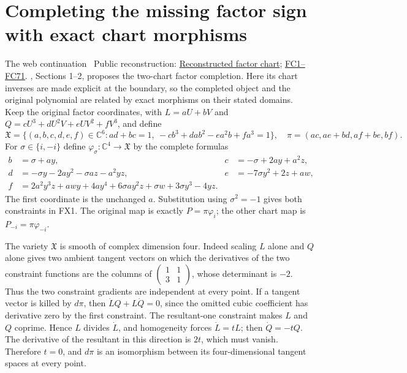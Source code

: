 \documentclass[11pt]{article}
\newcommand{\C}{\mathbb C}
\begin{document}
\section{Completing the missing factor sign with exact chart morphisms}
The web continuation \cite{WebFable}%
~Public reconstruction: \href{https://github.com/KokunoYumeto/zeta-function-research-reader/blob/689a8f87e9c12b7a99b01b3123438c6751ee608f/workbenches/splitzero-tandem/continuations/20260920-fable-boundary-action/source_intake/PROOF.md\#L1}{Reconstructed factor chart}; \href{https://github.com/KokunoYumeto/zeta-function-research-reader/blob/689a8f87e9c12b7a99b01b3123438c6751ee608f/workbenches/splitzero-tandem/continuations/20260920-fable-conductor/FABLE_TO_ORIGINAL_CONDUCTOR.tex\#L52}{FC1--FC71}.%
{}, Sections 1--2, proposes the
two-chart factor completion. Here its chart inverses are made explicit
at the boundary, so the completed object and the original polynomial
are related by exact morphisms on their stated domains.
Keep the original factor coordinates, with
$L=aU+bV$ and $Q=cU^3+dU^2V+eUV^2+fV^3$, and define
\[
 \mathfrak X=\{(a,b,c,d,e,f)\in\C^6:
 ad+bc=1,\ -cb^3+dab^2-ea^2b+fa^3=1\},
 \quad\pi=(ac,ae+bd,af+be,bf). \tag{FX1}
\]
For $\sigma\in\{i,-i\}$ define $\varphi_\sigma:\C^4\to\mathfrak X$
by the complete formulas
\[
 \begin{aligned}
 b&=\sigma+ay,&c&=-\sigma+2ay+a^2z,\\
 d&=-\sigma y-2ay^2-\sigma az-a^2yz,&
 e&=-7\sigma y^2+2z+aw,\\
 f&=2a^2y^3z+awy+4ay^4+6\sigma ay^2z+\sigma w
                                      +3\sigma y^3-4yz.
 \end{aligned} \tag{FX2}
\]
The first coordinate is the unchanged $a$.
Substitution using $\sigma^2=-1$ gives both constraints in FX1.
The original map is exactly $P=\pi\varphi_i$; the other chart
map is $P_{-i}=\pi\varphi_{-i}$.

The variety $\mathfrak X$ is smooth of complex dimension four.
Indeed scaling $L$ alone and $Q$ alone gives two ambient tangent
vectors on which the derivatives of the two constraint functions
are the columns of
$\left(\begin{smallmatrix}1&1\\3&1\end{smallmatrix}\right)$,
whose determinant is $-2$. Thus the two constraint gradients are
independent at every point. If a tangent vector is killed by
$d\pi$, then $\dot LQ+L\dot Q=0$, since the omitted cubic
coefficient has derivative zero by the first constraint. The
resultant-one constraint makes $L$ and $Q$ coprime. Hence $L$
divides $\dot L$, and homogeneity forces $\dot L=tL$;
then $\dot Q=-tQ$. The derivative of the resultant in this
direction is $2t$, which must vanish. Therefore $t=0$, and
$d\pi$ is an isomorphism between its four-dimensional tangent
spaces at every point.
\end{document}
